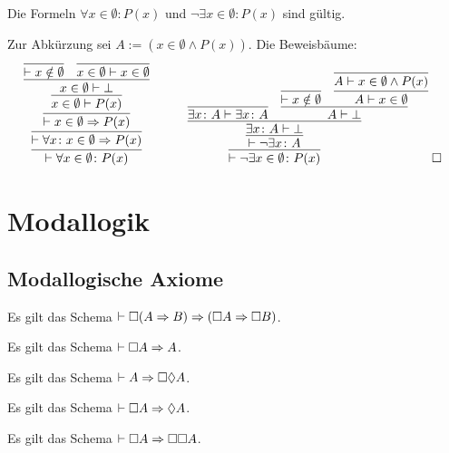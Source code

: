 \newpage
\begin{Satz}\newlinefirst
Die Formeln $\forall x\in\emptyset\colon P(x)$ und $\neg\exists x\in\emptyset\colon P(x)$
sind gültig.
\end{Satz}
\begin{Beweis}
Zur Abkürzung sei $A:=(x\in\emptyset\land P(x))$. Die Beweisbäume:
\[
\begin{array}{@{}l@{\qquad\quad}l}
\infer{\vdash\forall x\in\emptyset\colon P(x)}{
  \infer{\vdash\forall x\colon x\in\emptyset\Rightarrow P(x)}{
    \infer{\vdash x\in\emptyset\Rightarrow P(x)}{
      \infer{x\in\emptyset\vdash P(x)}{
        \infer{x\in\emptyset\vdash\bot}{
          \infer{\vdash x\notin\emptyset}{}
        & \infer{x\in\emptyset\vdash x\in\emptyset}{}}}}}}
&
\infer{\vdash\neg\exists x\in\emptyset\colon P(x)}{
  \infer{\vdash\neg\exists x\colon A}{
    \infer{\exists x\colon A\vdash\bot}{
      \infer{\exists x\colon A\vdash\exists x\colon A}{}
    & \infer{A\vdash\bot}{
        \infer{\vdash x\notin\emptyset}{}
      & \infer{A\vdash x\in\emptyset}{
          \infer{A\vdash x\in\emptyset\land P(x)}{}}}}}}\;\qedsymbol
\end{array}
\]
\end{Beweis}

\section{Modallogik}
\subsection{Modallogische Axiome}

\begin{Axiom}[K]\label{axiom-K}
Es gilt das Schema $\vdash\Box (A\Rightarrow B)\Rightarrow (\Box A\Rightarrow\Box B)$.
\end{Axiom}

\begin{Axiom}[T]
Es gilt das Schema $\vdash\Box A\Rightarrow A$.
\end{Axiom}

\begin{Axiom}[B]
Es gilt das Schema $\vdash A\Rightarrow\Box\Diamond A$.
\end{Axiom}

\begin{Axiom}[D]
Es gilt das Schema $\vdash\Box A\Rightarrow\Diamond A$.
\end{Axiom}

\begin{Axiom}[4]
Es gilt das Schema $\vdash\Box A\Rightarrow\Box\Box A$.
\end{Axiom}

